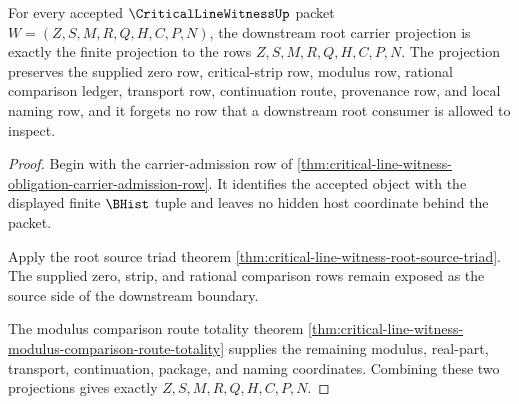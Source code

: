 \begin{theorem}
\label{thm:critical-line-witness-root-carrier-projection}
For every accepted $\CriticalLineWitnessUp$ packet $W=(Z,S,M,R,Q,H,C,P,N)$, the downstream root carrier projection is exactly the finite projection to the rows $Z,S,M,R,Q,H,C,P,N$. The projection preserves the supplied zero row, critical-strip row, modulus row, rational comparison ledger, transport row, continuation route, provenance row, and local naming row, and it forgets no row that a downstream root consumer is allowed to inspect.
\end{theorem}
\begin{proof}
Begin with the carrier-admission row of \autoref{thm:critical-line-witness-obligation-carrier-admission-row}. It identifies the accepted object with the displayed finite $\BHist$ tuple and leaves no hidden host coordinate behind the packet.

Apply the root source triad theorem \autoref{thm:critical-line-witness-root-source-triad}. The supplied zero, strip, and rational comparison rows remain exposed as the source side of the downstream boundary.

The modulus comparison route totality theorem \autoref{thm:critical-line-witness-modulus-comparison-route-totality} supplies the remaining modulus, real-part, transport, continuation, package, and naming coordinates. Combining these two projections gives exactly $Z,S,M,R,Q,H,C,P,N$.
\end{proof}

